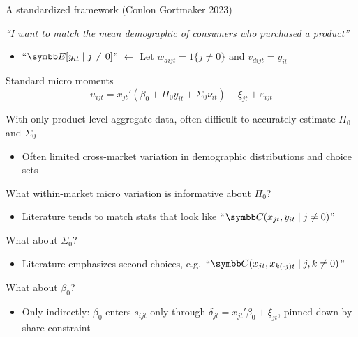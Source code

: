 \documentclass[aspectratio=169,10pt]{beamer}
\begin{document}
\begin{frame}[label=framework]{A standardized framework (Conlon Gortmaker 2023)}
\begin{wideitemize}
        \item \textit{``I want to match the mean demographic of consumers who purchased a product''}
        \begin{itemize}
            \item ``$\E[y_{it} \mid j \neq 0]$'' $\leftarrow$ Let $w_{dijt} = 1\{j \neq 0\}$ and $v_{dijt} = y_{it}$
        \end{itemize}
    \end{wideitemize}
\end{frame}



\begin{frame}[label=standard]{Standard micro moments}
    \begin{equation*}
        u_{ijt} = x_{jt}'(\beta_0 + \Pi_0 y_{it} + \Sigma_0 \nu_{it}) + \xi_{jt} + \varepsilon_{ijt}
    \end{equation*}
    
    \begin{wideitemize}
        \item With only product-level aggregate data, often difficult to accurately estimate $\Pi_0$ and $\Sigma_0$
        \begin{itemize}
            \item Often limited \alert{cross-market variation} in demographic distributions and choice sets
        \end{itemize}
        
        \item What \alert{within-market} micro variation is informative about $\Pi_0$?
        \begin{itemize}
            \item Literature tends to match stats that look like ``$\Cov(x_{jt}, y_{it} \mid j \neq 0)$''
        \end{itemize}
        
        \item What about $\Sigma_0$?
        \begin{itemize}
            \item Literature emphasizes \alert{second choices}, e.g.\ ``$\Cov(x_{jt}, x_{k(\text{-}j)t} \mid j, k \neq 0)$''
        \end{itemize}
        
        \item What about $\beta_0$?
        \begin{itemize}
            \item Only \alert{indirectly}: $\beta_0$ enters $s_{ijt}$ only through $\delta_{jt} = x_{jt}'\beta_0 + \xi_{jt}$, pinned down by share constraint
        \end{itemize}
    \end{wideitemize}
\end{frame}
\end{document}
